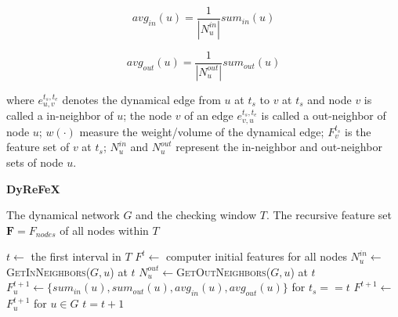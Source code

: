 \documentclass[a4paper,fleqn]{cas-sc}
\begin{document}
\noindent\begin{minipage}{.5\linewidth}
\begin{equation}
avg_{in}(u) = \frac{1}{|N_{u}^{in}|}sum_{in}(u)
\label{equ:avg_in}
\end{equation}
\end{minipage}%
\begin{minipage}{.5\linewidth}
\begin{equation}
avg_{out}(u) = \frac{1}{|N_{u}^{out}|}sum_{out}(u)
\label{equ:avg_out}
\end{equation}
\end{minipage}

where $e_{u,v}^{t_{s},t_{e}}$ denotes the dynamical edge from $u$ at $t_{s}$ to $v$ at $t_{s}$ and node $v$ is called a in-neighbor of $u$; the node $v$ of an edge $e_{v,u}^{t_{s},t_{e}}$ is called a out-neighbor of node $u$; $w(\cdot)$ measure the weight/volume of the dynamical edge; $F_{v}^{t_{s}}$ is the feature set of $v$ at $t_{s}$; $N_{u}^{in}$ and $N_{u}^{out}$ represent the in-neighbor and out-neighbor sets of node $u$.


\begin{algorithm}[!htb]
    \caption{\textbf{DyReFeX}}
    \label{alg:ALG1}
    \begin{algorithmic}
    \Require The dynamical network $G$ and the checking window $T$.
    \Ensure The recursive feature set $\textbf{F} = F_{nodes}$ of all nodes within $T$
    
        \State $t\gets$ the first interval in $T$
        \State $F^{t}\gets$ computer initial features for all nodes
        \State $N_{u}^{in}\gets$\textsc{GetInNeighbors}($G, u$) at $t$
        \State $N_{u}^{out}\gets$\textsc{GetOutNeighbors}($G, u$) at $t$
        \State $F_{u}^{t+1}\gets\{sum_{in}(u), sum_{out}(u), avg_{in}(u), avg_{out}(u)\}$ for $t_{s} == t$
        \EndFor
        \State  $F^{t+1}\gets$ $F_{u}^{t+1}$ for $u\in G$
        \State $t=t+1$
        \EndFor
    \EndProcedure
    \end{algorithmic}\label{alg:alg1}
\end{algorithm}
\end{document}
